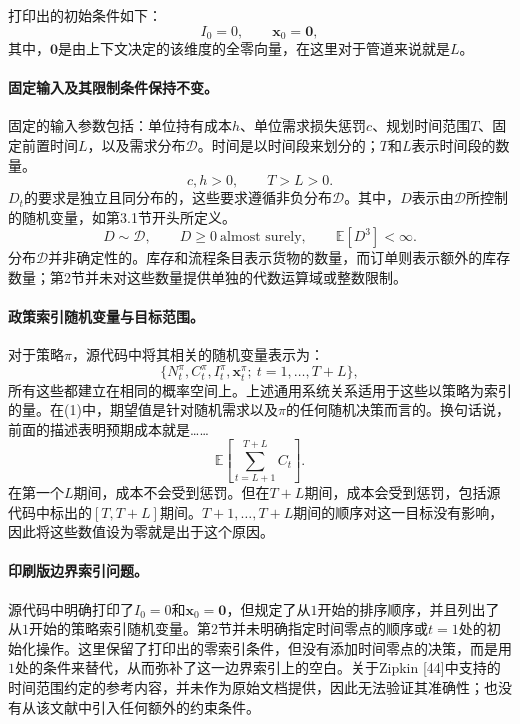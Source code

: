 \documentclass{article}
\begin{document}
打印出的初始条件如下：
\[
I_0=0,\qquad \mathbf{x}_0=\mathbf{0},
\]
其中，$\mathbf{0}$是由上下文决定的该维度的全零向量，在这里对于管道来说就是$L$。

\paragraph{固定输入及其限制条件保持不变。}
固定的输入参数包括：单位持有成本$h$、单位需求损失惩罚$c$、规划时间范围$T$、固定前置时间$L$，以及需求分布$\mathcal{D}$。时间是以时间段来划分的；$T$和$L$表示时间段的数量。
\[
c,h>0,\qquad T>L>0.
\]
$D_t$的要求是独立且同分布的，这些要求遵循非负分布$\mathcal{D}$。其中，$D$表示由$\mathcal{D}$所控制的随机变量，如第3.1节开头所定义。
\[
D\sim\mathcal{D},\qquad D\geq 0\ \text{almost surely},\qquad \mathbb{E}[D^3]<\infty.
\]
分布$\mathcal{D}$并非确定性的。库存和流程条目表示货物的数量，而订单则表示额外的库存数量；第2节并未对这些数量提供单独的代数运算域或整数限制。

\paragraph{政策索引随机变量与目标范围。}
对于策略$\pi$，源代码中将其相关的随机变量表示为：
\[
\{N_t^\pi,C_t^\pi,I_t^\pi,\mathbf{x}_t^\pi;\ t=1,\ldots,T+L\},
\]
所有这些都建立在相同的概率空间上。上述通用系统关系适用于这些以策略为索引的量。在(1)中，期望值是针对随机需求以及$\pi$的任何随机决策而言的。换句话说，前面的描述表明预期成本就是……
\[
\mathbb{E}\!\left[\sum_{t=L+1}^{T+L}C_t\right].
\]
在第一个$L$期间，成本不会受到惩罚。但在$T+L$期间，成本会受到惩罚，包括源代码中标出的$[T,T+L]$期间。$T+1,\ldots,T+L$期间的顺序对这一目标没有影响，因此将这些数值设为零就是出于这个原因。

\paragraph{印刷版边界索引问题。}
源代码中明确打印了$I_0=0$和$\mathbf{x}_0=\mathbf{0}$，但规定了从$1$开始的排序顺序，并且列出了从$1$开始的策略索引随机变量。第2节并未明确指定时间零点的顺序或$t=1$处的初始化操作。这里保留了打印出的零索引条件，但没有添加时间零点的决策，而是用$1$处的条件来替代，从而弥补了这一边界索引上的空白。关于Zipkin [44]中支持的时间范围约定的参考内容，并未作为原始文档提供，因此无法验证其准确性；也没有从该文献中引入任何额外的约束条件。
\end{document}
